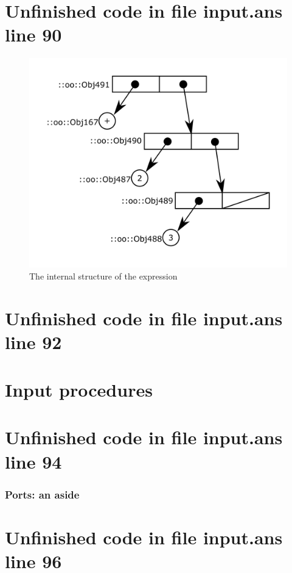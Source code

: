 \documentclass[twoside,9pt]{report}
\begin{document}
\section{Unfinished code in file input.ans line 90}
\begin{figure}[h!]\includegraphics{images/intreplist.png}\captionsetup{labelformat=empty}\caption{ The internal structure of the expression}\label{fig:-the-internal-structure-of-the-expression}\end{figure}
\section{Unfinished code in file input.ans line 92}
\section{Input procedures}
\label{input-procedures}
\section{Unfinished code in file input.ans line 94}
\subsubsection{Ports: an aside}
\label{ports-an-aside}
\section{Unfinished code in file input.ans line 96}
\end{document}
